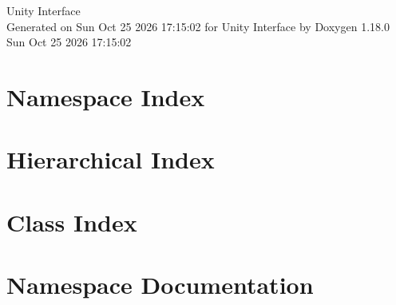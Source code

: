 \documentclass[twoside]{book}
\newcommand{\+}{\discretionary{\mbox{\scriptsize$\hookleftarrow$}}{}{}}
\newcommand{\clearemptydoublepage}{%
    \newpage{\pagestyle{empty}\cleardoublepage}%
  }
\begin{document}
  \raggedbottom
    \hypersetup{pageanchor=false,
                bookmarksnumbered=true,
                pdfencoding=unicode
               }
  \begin{titlepage}
  \vspace*{7cm}
  \begin{center}%
  {\Large Unity Interface}\\
  \vspace*{1cm}
  {\large Generated on Sun Oct 25 2026 17:\+15:\+02 for Unity Interface by Doxygen 1.18.0}\\
    \vspace*{0.5cm}
    {\small Sun Oct 25 2026 17:15:02}
  \end{center}
  \end{titlepage}
  \clearemptydoublepage
  \tableofcontents
  \clearemptydoublepage
  \hypersetup{pageanchor=true}
\chapter{Namespace Index}

\chapter{Hierarchical Index}

\chapter{Class Index}

\chapter{Namespace Documentation}


\end{document}
